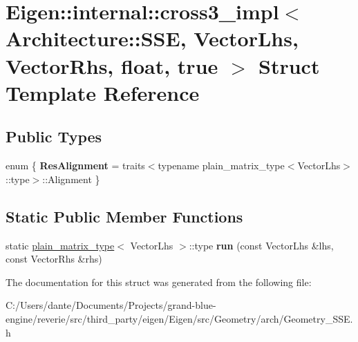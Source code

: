 \hypertarget{struct_eigen_1_1internal_1_1cross3__impl_3_01_architecture_1_1_s_s_e_00_01_vector_lhs_00_01_vect981fca9d3c0a247b027e5ff23e43a093}{}\section{Eigen\+::internal\+::cross3\+\_\+impl$<$ Architecture\+::S\+SE, Vector\+Lhs, Vector\+Rhs, float, true $>$ Struct Template Reference}
\label{struct_eigen_1_1internal_1_1cross3__impl_3_01_architecture_1_1_s_s_e_00_01_vector_lhs_00_01_vect981fca9d3c0a247b027e5ff23e43a093}
\subsection*{Public Types}
\begin{DoxyCompactItemize}
\item 
\mbox{\label{struct_eigen_1_1internal_1_1cross3__impl_3_01_architecture_1_1_s_s_e_00_01_vector_lhs_00_01_vect981fca9d3c0a247b027e5ff23e43a093_af765128cbd5744ae0d3a75367d873af7}} 
enum \{ {\bfseries Res\+Alignment} = traits$<$typename plain\+\_\+matrix\+\_\+type$<$Vector\+Lhs$>$\+::type$>$\+::Alignment
 \}
\end{DoxyCompactItemize}
\subsection*{Static Public Member Functions}
\begin{DoxyCompactItemize}
\item 
\mbox{\label{struct_eigen_1_1internal_1_1cross3__impl_3_01_architecture_1_1_s_s_e_00_01_vector_lhs_00_01_vect981fca9d3c0a247b027e5ff23e43a093_a69ce61c22f1e2e9ffbb446b4cb039b81}} 
static \mbox{\hyperlink{struct_eigen_1_1internal_1_1plain__matrix__type}{plain\+\_\+matrix\+\_\+type}}$<$ Vector\+Lhs $>$\+::type {\bfseries run} (const Vector\+Lhs \&lhs, const Vector\+Rhs \&rhs)
\end{DoxyCompactItemize}


The documentation for this struct was generated from the following file\+:\begin{DoxyCompactItemize}
\item 
C\+:/\+Users/dante/\+Documents/\+Projects/grand-\/blue-\/engine/reverie/src/third\+\_\+party/eigen/\+Eigen/src/\+Geometry/arch/Geometry\+\_\+\+S\+S\+E.\+h\end{DoxyCompactItemize}
